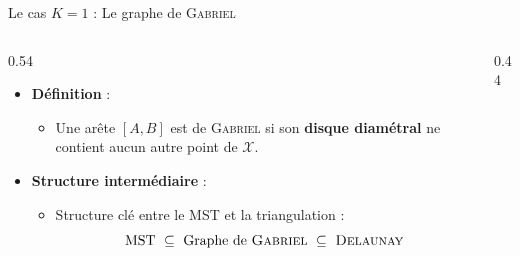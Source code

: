 \documentclass[A4,svgnames,9pt,aspectratio=169]{beamer}
\begin{document}
\begin{frame}{Le cas $K=1$ : Le graphe de \textsc{Gabriel}}
    \begin{columns}[c, onlytextwidth]
        \begin{column}{0.54\textwidth}
            \begin{itemize}
                \setlength{\itemsep}{10pt}
                \item \textbf{Définition} :
                \begin{itemize}
                    \item Une arête $[A, B]$ est de \textsc{Gabriel} si son \textbf{disque diamétral} ne contient aucun autre point de $\mathcal{X}$.
                \end{itemize}
                \item \textbf{Structure intermédiaire} :
                \begin{itemize}
                    \item Structure clé entre le MST et la triangulation :
                    \[ \text{MST} \ \subseteq \ \text{Graphe de \textsc{Gabriel}} \ \subseteq \ \text{\textsc{Delaunay}} \]
                \end{itemize}
            \end{itemize}
        \end{column}
        
        \begin{column}{0.44\textwidth}
            \begin{center}
\end{center}
\end{column}
\end{columns}
\end{frame}
\end{document}

